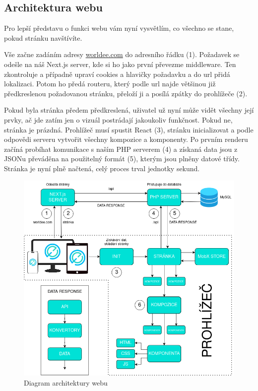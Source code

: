 \subsection{Architektura webu}
Pro lepší představu o funkci webu vám nyní vysvětlím, co všechno se stane, pokud stránku navštívíte.

Vše začne zadáním adresy \href{https://www.worldee.com}{worldee.com} do adresního řádku (1). Požadavek se odešle na náš Next.js server, kde si ho jako první převezme middleware. Ten zkontroluje a případně upraví cookies a hlavičky požadavku a do url přidá lokalizaci. Potom ho předá routeru, který podle url najde většinou již předkreslenou požadovanou stránku, přeloží ji a posílá zpátky do prohlížeče (2).

Pokud byla stránka předem předkreslená, uživatel už nyní může vidět všechny její prvky, ač jde zatím jen o vizuál postrádají jakoukoliv funkčnost. Pokud ne, stránka je prázdná. Prohlížeč musí spustit React (3), stránku inicializovat a podle odpovědi serveru vytvořit všechny kompozice a komponenty. Po prvním renderu začíná probíhat komunikace s naším PHP serverem (4) a získaná data jsou z JSONu převáděna na použitelný formát (5), kterým jsou plněny datové třídy. Stránka je nyní plně načtená, celý proces trval jednotky sekund. 

\begin{figure}[!h]
    \centering
    \includegraphics[width=1\linewidth]{obrazky/architektura.png}
    \caption{Diagram architektury webu}
\end{figure}
\clearpage

